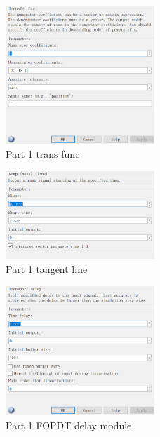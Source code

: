 \documentclass[11pt, a4paper]{article}
\begin{document}
\begin{figure}[htbp]     \begin{centering}
    \includegraphics[width=0.5\textwidth]{a1_1.png}
    \caption{Part 1 trans func}
    \end{centering}
\end{figure}

\begin{figure}[htbp]     \begin{centering}
    \includegraphics[width=0.5\textwidth]{a1_2.png}
    \caption{Part 1 tangent line}
    \end{centering}
\end{figure}

\begin{figure}[htbp]     \begin{centering}
    \includegraphics[width=0.5\textwidth]{a1_3.png}
    \caption{Part 1 FOPDT delay module}
    \end{centering}
\end{figure}
\end{document}
